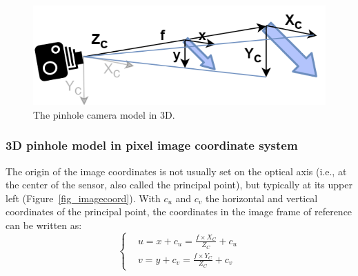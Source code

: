 

\begin{figure}[hbtp]
	\centering
	\def\svgwidth{\columnwidth}
	\fontsize{10pt}{10pt}\selectfont
	\includegraphics[width=0.5\linewidth]{"../Chap2/Figures/Camera_3D.png"}
	\caption{The pinhole camera model in 3D.} 
	\label{fig_camera3d}
\end{figure}


\subsubsection{3D pinhole model in pixel image coordinate system}

The origin of the image coordinates is not usually set on the optical axis (i.e., at the center of the sensor, also called the principal point), but typically at its upper left (Figure~\ref{fig_imagecoord}). With $c_u$ and $c_v$ the horizontal and vertical coordinates of the principal point, the coordinates in the image frame of reference can be written as: 
\begin{equation}
  \begin{cases}
    &u = x + c_u = \frac{f\times X_C}{Z_C} + c_u\\
    &v = y + c_v = \frac{f\times Y_C}{Z_C} + c_v
  \end{cases}
\end{equation}


